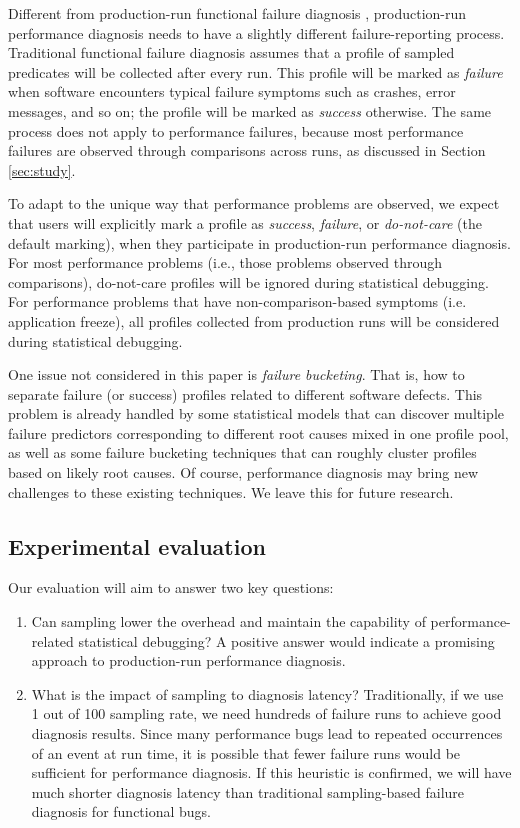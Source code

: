 Different from production-run functional failure diagnosis
\citep{liblit03,liblit05,CCI,joy.asplos13}, production-run performance diagnosis
needs to have a slightly different failure-reporting process.
Traditional functional failure diagnosis assumes that a profile of
sampled predicates will be collected after
every run. This profile will be marked as
\textit{failure} when software encounters typical failure symptoms such as 
crashes, error messages, and so on; the profile will be marked
as \textit{success} otherwise. The same process does not apply to performance
failures, because most performance failures are observed through
comparisons across runs, as discussed in Section \ref{sec:study}. 

To adapt to the unique way that performance problems are observed, we 
expect that users will explicitly mark a profile as \textit{success}, 
\textit{failure}, or \textit{do-not-care} (the default marking), when they 
participate in production-run performance diagnosis. For most performance 
problems (i.e., those problems observed through comparisons), do-not-care
profiles will be ignored during statistical debugging. For performance problems
that have non-comparison-based symptoms (i.e. application freeze), all
profiles collected from production runs will be considered during statistical
debugging.

One issue not considered in this paper is \textit{failure bucketing}. That is, 
how to separate failure (or success) profiles related to different software 
defects. This problem is already handled by some statistical models 
\citep{liblit03,liblit05} that can discover multiple failure predictors
corresponding to different root causes mixed in one
profile pool, as well as some failure bucketing techniques
\citep{hunt.sosp09}
that can roughly cluster profiles based on likely root causes.
Of course, performance diagnosis may bring new challenges to these
existing techniques. We leave this for future research.

\subsection{Experimental evaluation}

Our evaluation will aim to answer two key questions:

\begin{enumerate}
\item Can sampling lower the overhead and maintain the capability of
performance-related statistical debugging? A positive answer would indicate
a promising approach to production-run performance diagnosis.

\item What is the impact of sampling to diagnosis latency?
Traditionally, if we use 1 out of 100 sampling rate, we need hundreds of failure
runs to achieve good diagnosis results. Since many performance bugs lead
to repeated occurrences of an event at run time, it is possible that fewer
failure runs would be sufficient for performance diagnosis. If this heuristic
is confirmed, we will have much shorter diagnosis latency than traditional
sampling-based failure diagnosis for functional bugs.
\end{enumerate}


